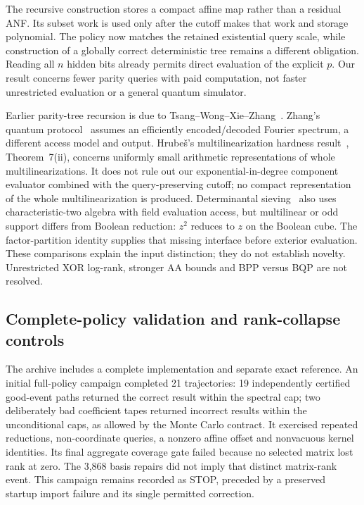 \documentclass[11pt]{article}
\theoremstyle{remark}\newtheorem{remark}[theorem]{Remark}
\begin{document}
The recursive construction stores a compact affine map rather than a residual ANF. Its subset work is used only after the cutoff makes that work and storage polynomial. The policy now matches the retained existential query scale, while construction of a globally correct deterministic tree remains a different obligation. Reading all $n$ hidden bits already permits direct evaluation of the explicit $p$. Our result concerns fewer parity queries with paid computation, not faster unrestricted evaluation or a general quantum simulator.

Earlier parity-tree recursion is due to Tsang--Wong--Xie--Zhang~\cite{TWXZ}. Zhang's quantum protocol~\cite{Z14} assumes an efficiently encoded/decoded Fourier spectrum, a different access model and output. Hrube\v{s}'s multilinearization hardness result~\cite{H15}, Theorem~7(ii), concerns uniformly small arithmetic representations of whole multilinearizations. It does not rule out our exponential-in-degree component evaluator combined with the query-preserving cutoff; no compact representation of the whole multilinearization is produced. Determinantal sieving~\cite{EKW} also uses characteristic-two algebra with field evaluation access, but multilinear or odd support differs from Boolean reduction: $z^2$ reduces to $z$ on the Boolean cube. The factor-partition identity supplies that missing interface before exterior evaluation. These comparisons explain the input distinction; they do not establish novelty. Unrestricted XOR log-rank, stronger AA bounds and BPP versus BQP are not resolved.

\subsection{Complete-policy validation and rank-collapse controls}
The archive includes a complete implementation and separate exact reference. An initial full-policy campaign completed 21 trajectories: 19 independently certified good-event paths returned the correct result within the spectral cap; two deliberately bad coefficient tapes returned incorrect results within the unconditional caps, as allowed by the Monte Carlo contract. It exercised repeated reductions, non-coordinate queries, a nonzero affine offset and nonvacuous kernel identities. Its final aggregate coverage gate failed because no selected matrix lost rank at zero. The 3,868 basis repairs did not imply that distinct matrix-rank event. This campaign remains recorded as STOP, preceded by a preserved startup import failure and its single permitted correction.
\end{document}
